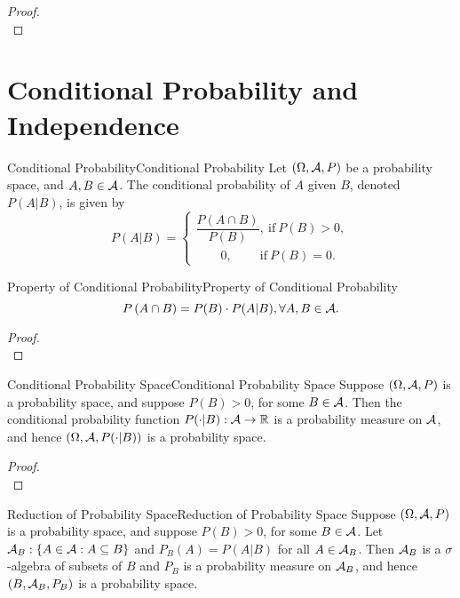 \documentclass{elegantbook}
\begin{document}
\begin{proof}
\\[4cm]\vspace{0.01cm}
\end{proof}

\chapter{Conditional Probability and Independence}

\begin{definition}{Conditional Probability}{Conditional Probability}
Let $(\Omega,\mathcal{A}, P)$ be a probability space, and $A,B\in\mathcal{A}$. The conditional probability of $A$ given $B$, denoted $P(A|B)$, is given by
$$P(A|B)=
\begin{cases}
\dfrac{P(A\cap B)}{P(B)},\ \text{if}\  P(B)>0,  \\
     \qquad 0          ,\qquad\ \text{if}\  P(B)=0.
\end{cases}
$$
\end{definition}

\begin{remark}{Property of Conditional Probability}{Property of Conditional Probability}
$$P\left(A\cap B\right)=P(B)\cdot P(A|B),\forall A,B\in\mathcal{A}.$$ 
\end{remark}

\begin{proof}
\\[2cm]\vspace{0.01cm}
\end{proof}

\begin{theorem}{Conditional Probability Space}{Conditional Probability Space}
Suppose $(\Omega,\mathcal{A}, P)$ is a probability space, and suppose $P(B)>0$, for some $B\in\mathcal{A}$. 
Then the conditional probability function $P(\cdot|B): \mathcal{A}\rightarrow\mathbb{R}$ is a probability measure on $\mathcal{A}$, and hence $(\Omega,\mathcal{A}, P(\cdot|B))$ is a probability space.
\end{theorem}

\begin{proof}
\\[2cm]\vspace{0.01cm}
\end{proof}

\begin{theorem}{Reduction of Probability Space}{Reduction of Probability Space}
Suppose $(\Omega,\mathcal{A}, P)$ is a probability space, and suppose $P(B)>0$, for some $B\in\mathcal{A}$. Let $\mathcal{A}_B:\{A\in\mathcal{A}: A\subseteq B\}$ and $P_B (A)=P(A|B)$  for all $A\in\mathcal{A}_B$.  Then $\mathcal{A}_B$ is a $\sigma$-algebra of subsets of $B$ and $P_B$ is a probability measure on $\mathcal{A}_B$, and hence $(B,\mathcal{A}_B,P_B )$ is a probability space.
\end{theorem}
\end{document}
